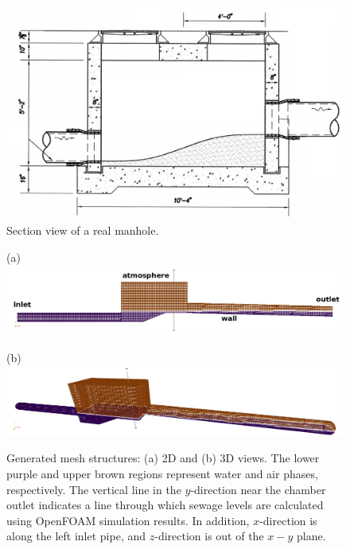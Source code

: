 \vfill\newpage\null
\vfill
\begin{figure}[H]
\begin{centering}
\includegraphics[width=5in]{Figures/Fig01-manhole-simple}
\par\end{centering}
\caption{Section view of a real manhole.}
\label{fig:manhole-section-view}
\end{figure}

\vfill

\newpage\null
\vfill
\begin{figure}[H]
\begin{centering}
(a)\includegraphics[width=6in]{Figures/Fig02-Mesh-2D-antd}
\par\end{centering}
\begin{centering}
(b)\includegraphics[width=6in]{Figures/Fig02-Mesh-3D}
\par\end{centering}
\caption{Generated mesh structures: (a) 2D and (b) 3D views. The lower purple
and upper brown regions represent water and air phases, respectively.
The vertical line in the $y$-direction near the chamber outlet indicates
a line through which sewage levels are calculated using OpenFOAM simulation
results. In addition, $x$-direction is along the left inlet pipe,
and $z$-direction is out of the $x-y$ plane.}

\label{fig:mesh-struct}
\end{figure}

\vfill
